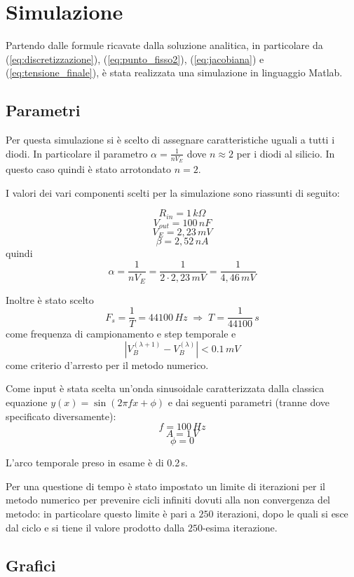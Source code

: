 \chapter{Simulazione}
	Partendo dalle formule ricavate dalla soluzione analitica, in particolare da (\ref{eq:discretizzazione}), (\ref{eq:punto_fisso2}), (\ref{eq:jacobiana}) e (\ref{eq:tensione_finale}), è stata realizzata una simulazione in linguaggio Matlab.
	
	\section{Parametri}
		Per questa simulazione si è scelto di assegnare caratteristiche uguali a tutti i diodi. In particolare il parametro $\alpha = \frac{1}{nV_{E}}$ dove $n \approx 2$ per i diodi al silicio. In questo caso quindi è stato arrotondato $n = 2$.
	
		I valori dei vari componenti scelti per la simulazione sono riassunti di seguito:
	
		\[
			R_{in} = 1\,k\Omega
		\]
		\[
			V_{out} = 100\,nF
		\]
		\[
			V_{E} = 2,23\,mV
		\]
		\[
			\beta = 2,52\,nA
		\]
		quindi
		\[
			\alpha = \frac{1}{nV_{E}} = \frac{1}{2 \cdot 2,23\,mV} = \frac{1}{4,46\,mV}
		\]
	
		Inoltre è stato scelto
		\[
			F_{s} = \frac{1}{T} = 44100\,Hz \; \Rightarrow \; T = \frac{1}{44100}\,s
		\]
		come frequenza di campionamento e step temporale e
		\[
			|V_{B}^{(\lambda+1)} - V_{B}^{(\lambda)}| < 0.1\,mV
		\]
		come criterio d'arresto per il metodo numerico.
	
		Come input è stata scelta un'onda sinusoidale caratterizzata dalla classica equazione $y(x) = \sin (2 \pi f x + \phi)$ e dai seguenti parametri (tranne dove specificato diversamente):
		\[
			f = 100\,Hz
		\]
		\[
			A = 1\,V
		\]
		\[
			\phi = 0
		\]
		
		\vspace{10px}
		L'arco temporale preso in esame è di 0.2\,s.
		
		Per una questione di tempo è stato impostato un limite di iterazioni per il metodo numerico per prevenire cicli infiniti dovuti alla non convergenza del metodo: in particolare questo limite è pari a $250$ iterazioni, dopo le quali si esce dal ciclo e si tiene il valore prodotto dalla $250$-esima iterazione.
	\pagebreak
	
	\section{Grafici}
